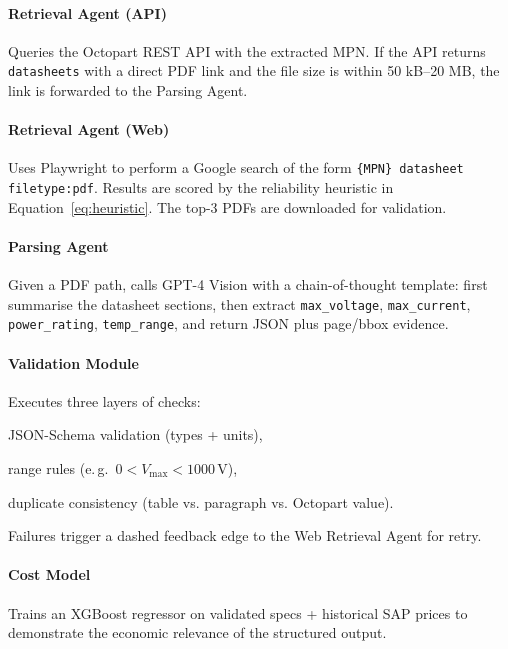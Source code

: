 \paragraph{Retrieval Agent (API)}  
Queries the Octopart REST API with the extracted MPN.  
If the API returns \verb|datasheets| with a direct PDF link and the file size is within 50 kB–20 MB, the link is forwarded to the Parsing Agent.

\paragraph{Retrieval Agent (Web)}  
Uses Playwright to perform a Google search of the form  
\texttt{\{MPN\} datasheet filetype:pdf}.  
Results are scored by the reliability heuristic in Equation~\eqref{eq:heuristic}.  
The top-3 PDFs are downloaded for validation.

\paragraph{Parsing Agent}  
Given a PDF path, calls GPT-4 Vision with a chain-of-thought template: first summarise the datasheet sections, then extract \verb|max_voltage|, \verb|max_current|, \verb|power_rating|, \verb|temp_range|, and return JSON plus page/bbox evidence.

\paragraph{Validation Module}  
Executes three layers of checks:
\begin{enumerate*}
  \item JSON-Schema validation (types + units),
  \item range rules (e.\,g.\ $0 < V_\text{max} < 1000\,\text{V}$),
  \item duplicate consistency (table vs. paragraph vs. Octopart value).
\end{enumerate*}  
Failures trigger a dashed feedback edge to the Web Retrieval Agent for retry.

\paragraph{Cost Model}  
Trains an XGBoost regressor on validated specs + historical SAP prices to demonstrate the economic relevance of the structured output.

